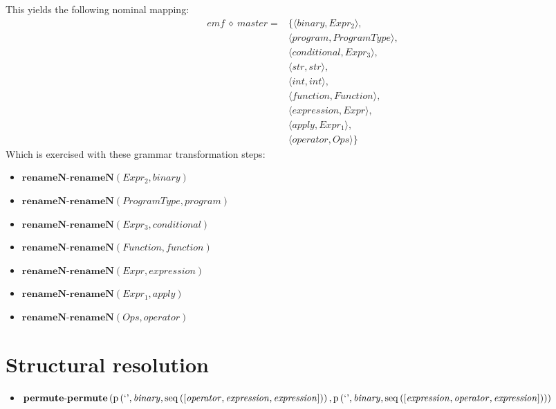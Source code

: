 This yields the following nominal mapping:
\begin{align*}\mathit{emf} \:\diamond\: \mathit{master} =& \{\langle \mathit{binary},\mathit{Expr_2}\rangle,\\
 & \langle \mathit{program},\mathit{ProgramType}\rangle,\\
 & \langle \mathit{conditional},\mathit{Expr_3}\rangle,\\
 & \langle str,str\rangle,\\
 & \langle int,int\rangle,\\
 & \langle \mathit{function},\mathit{Function}\rangle,\\
 & \langle \mathit{expression},\mathit{Expr}\rangle,\\
 & \langle \mathit{apply},\mathit{Expr_1}\rangle,\\
 & \langle \mathit{operator},\mathit{Ops}\rangle\}\end{align*}
 Which is exercised with these grammar transformation steps:

{\footnotesize\begin{itemize}
\item $\mathbf{renameN\text{-}renameN}\left(\mathit{Expr_2},\mathit{binary}\right)$
\item $\mathbf{renameN\text{-}renameN}\left(\mathit{ProgramType},\mathit{program}\right)$
\item $\mathbf{renameN\text{-}renameN}\left(\mathit{Expr_3},\mathit{conditional}\right)$
\item $\mathbf{renameN\text{-}renameN}\left(\mathit{Function},\mathit{function}\right)$
\item $\mathbf{renameN\text{-}renameN}\left(\mathit{Expr},\mathit{expression}\right)$
\item $\mathbf{renameN\text{-}renameN}\left(\mathit{Expr_1},\mathit{apply}\right)$
\item $\mathbf{renameN\text{-}renameN}\left(\mathit{Ops},\mathit{operator}\right)$
\end{itemize}}

\section{Structural resolution}
{\footnotesize\begin{itemize}
\item $\mathbf{permute\text{-}permute}\\\left(\mathrm{p}\left(\text{`'},\mathit{binary},\mathrm{seq}\left(\left[\mathit{operator}, \mathit{expression}, \mathit{expression}\right]\right)\right),\\\mathrm{p}\left(\text{`'},\mathit{binary},\mathrm{seq}\left(\left[\mathit{expression}, \mathit{operator}, \mathit{expression}\right]\right)\right)\right)$
\end{itemize}}
